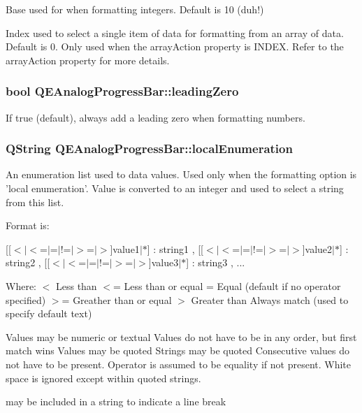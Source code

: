Base used for when formatting integers. Default is 10 (duh!)

Index used to select a single item of data for formatting from an array of data. Default is 0. Only used when the arrayAction property is INDEX. Refer to the arrayAction property for more details. \hypertarget{classQEAnalogProgressBar_adf6dff6a139bd375149301b5e58177f2}{
\subsubsection[{leadingZero}]{\setlength{\rightskip}{0pt plus 5cm}bool QEAnalogProgressBar::leadingZero}}
\label{classQEAnalogProgressBar_adf6dff6a139bd375149301b5e58177f2}
If true (default), always add a leading zero when formatting numbers. \hypertarget{classQEAnalogProgressBar_af3ef0e81d75e5502cf4e67b7b179a093}{
\subsubsection[{localEnumeration}]{\setlength{\rightskip}{0pt plus 5cm}QString QEAnalogProgressBar::localEnumeration}}
\label{classQEAnalogProgressBar_af3ef0e81d75e5502cf4e67b7b179a093}
An enumeration list used to data values. Used only when the formatting option is 'local enumeration'. Value is converted to an integer and used to select a string from this list.

Format is:

\mbox{[}\mbox{[}$<$$|$$<$=$|$=$|$!=$|$$>$=$|$$>$\mbox{]}value1$|$$\ast$\mbox{]} : string1 , \mbox{[}\mbox{[}$<$$|$$<$=$|$=$|$!=$|$$>$=$|$$>$\mbox{]}value2$|$$\ast$\mbox{]} : string2 , \mbox{[}\mbox{[}$<$$|$$<$=$|$=$|$!=$|$$>$=$|$$>$\mbox{]}value3$|$$\ast$\mbox{]} : string3 , ...

Where: $<$ Less than $<$= Less than or equal = Equal (default if no operator specified) $>$= Greather than or equal $>$ Greater than Always match (used to specify default text)

Values may be numeric or textual Values do not have to be in any order, but first match wins Values may be quoted Strings may be quoted Consecutive values do not have to be present. Operator is assumed to be equality if not present. White space is ignored except within quoted strings. \par
 may be included in a string to indicate a line break


